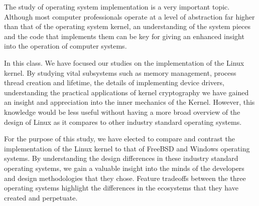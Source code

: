 The study of operating system implementation is a very important topic.  Although most computer professionals operate at a level of abstraction far higher than that of the operating system kernel, an understanding of the system pieces and the code that implements them can be key for giving an enhanced insight into the operation of computer systems.

In this class.  We have focused our studies on the implementation of the Linux kernel.  By studying vital subsystems such as memory management, process thread creation and lifetime, the details of implementing device drivers, understanding the practical applications of kernel cryptography we have gained an insight and appreciation into the inner mechanics of the Kernel.  However, this knowledge would be less useful without having a more broad overview of the design of Linux as it compares to other industry standard operating systems.

For the purpose of this study, we have elected to compare and contrast the implementation of the Linux kernel to that of FreeBSD and Windows operating systems.  By understanding the design differences in these industry standard operating systems, we gain a valuable insight into the minds of the developers and design methodologies that they chose.  Feature tradeoffs between the three operating systems highlight the differences in the ecosystems that they have created and perpetuate.
